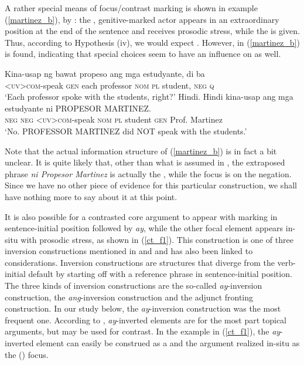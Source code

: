 \documentclass[output=paper,
,modfonts
,nonflat]{langsci/langscibook}
\begin{document}
A rather special means of focus/contrast marking is shown in example (\ref{martinez_b}), by \cite[194]{kauda05}: the , genitive-marked actor appears in an extraordinary position at the end of the sentence and receives prosodic stress, while the  is given. Thus, according to Hypothesis (iv), we would expect . However, in (\ref{martinez_b})  is found, indicating that special  choices seem to have an influence on  as well.

\begin{exe}
\ex
\begin{xlist}
\ex\label{martinez_a}
\gll K{\USSmaller}in{\USGreater}a-usap ng bawat propeso ang mga estudyante, di ba{\USQMark}\\   
     \textsc{<uv>com}-speak \textsc{gen} each professor \textsc{nom} \textsc{pl} student, \textsc{neg} \textsc{q}\\
\glt `Each professor spoke with the students, right?'
\ex\label{martinez_b}
\gll Hindi. Hindi k{\USSmaller}in{\USGreater}a-usap ang mga estudyante ni {{\ob}PROPESOR} {MARTINEZ{\cb}\focus}.\\
     \textsc{neg} \textsc{neg} \textsc{<uv>com}-speak \textsc{nom} \textsc{pl}     student \textsc{gen}  {\void{[}Prof.} Martinez\\ 
\glt `No. PROFESSOR MARTINEZ did NOT speak with the students.' 
\end{xlist}
\end{exe}

\noindent Note that the actual information structure of (\ref{martinez_b}) is in fact a bit unclear. It is quite likely that, other than what is assumed in \cite{kauda05}, the extraposed phrase \textit{ni Propesor Martinez} is actually the , while the focus is on the negation. Since we have no other piece of evidence for this particular construction, we shall have nothing more to say about it at this point.

It is also possible for a contrasted core argument to appear with  marking in sentence-initial position followed by \textit{ay}, while the other focal element appears in-situ with prosodic stress, as shown in (\ref{ct_f1}). This construction is one of three inversion constructions mentioned in \cite{schpa72} and \cite{valro15} and has also been linked to  considerations. Inversion constructions are structures that diverge from the verb-initial default  by starting off with a reference phrase in sentence‐initial position. The three kinds of inversion constructions are the so-called \textit{ay}-inversion construction, the \textit{ang}-inversion construction and the adjunct fronting construction. In our study below, the \textit{ay}-inversion construction was the most frequent one. According to \cite{schpa72}, \textit{ay}-inverted elements are for the most part topical arguments, but may be used for contrast. In the example in (\ref{ct_f1}), the \textit{ay}-inverted element can easily be construed as a  and the argument realized in-situ as the () focus. 
\end{document}
